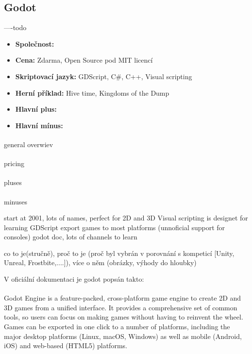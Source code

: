 \subsection{Godot}
----todo \linebreak
{}

\begin{itemize}
	\item \textbf{Společnost: }
	\item \textbf{Cena: } Zdarma,  Open Source pod MIT licencí
	\item \textbf{Skriptovací jazyk: } GDScript, C\#, C++, Visual scripting
	\item \textbf{Herní příklad: } Hive time, Kingdoms of the Dump
	\item \textbf{Hlavní plus: }
	\item \textbf{Hlavní mínus: }
\end{itemize}

\paragraph{}
general overwiev

\paragraph{}
pricing

\paragraph{}
pluses

\paragraph{}
minuses



start at 2001, lots of names, perfect for 2D and 3D
Visual scripting is designet for learning GDScript
export games to most platforms (unnoficial support for consoles)
godot doc, lots of channels to learn


co to je(stručně), proč to je (proč byl vybrán  v porovnání s kompeticí [Unity, Unreal, Frostbite,....]), více o  něm (obrázky, výhody do hloubky)

V oficiální dokumentaci je godot popsán takto:

\paragraph{}
Godot Engine is a feature-packed, cross-platform game engine to create 2D and 3D games from a unified interface. It provides a comprehensive set of common tools, so users can focus on making games without having to reinvent the wheel. Games can be exported in one click to a number of platforms, including the major desktop platforms (Linux, macOS, Windows) as well as mobile (Android, iOS) and web-based (HTML5) platforms.

